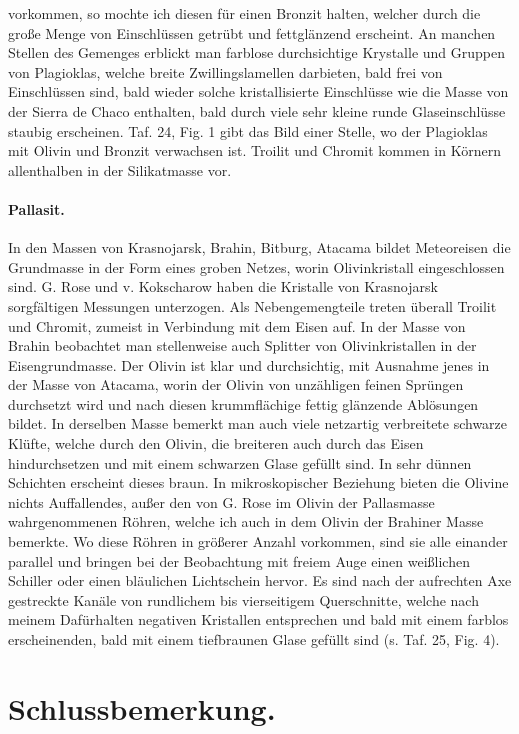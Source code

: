 \documentclass[a4paper, 12pt, oneside]{article}
\begin{document}
vorkommen, so mochte ich diesen für einen Bronzit halten, welcher durch die große Menge von Einschlüssen getrübt und fettglänzend erscheint. An manchen Stellen des Gemenges erblickt man farblose durchsichtige Krystalle und Gruppen von Plagioklas, welche breite Zwillingslamellen darbieten, bald frei von Einschlüssen sind, bald wieder solche kristallisierte Einschlüsse wie die Masse von der Sierra de Chaco enthalten, bald durch viele sehr kleine runde Glaseinschlüsse staubig erscheinen. Taf. 24, Fig. 1 gibt das Bild einer Stelle, wo der Plagioklas mit Olivin und Bronzit verwachsen ist. Troilit und Chromit kommen in Körnern allenthalben in der Silikatmasse vor.

\paragraph{Pallasit.} In den Massen von Krasnojarsk, Brahin, Bitburg, Atacama bildet Meteoreisen die Grundmasse in der Form eines groben Netzes, worin Olivinkristall eingeschlossen sind. G. Rose und v. Kokscharow haben die Kristalle von Krasnojarsk sorgfältigen Messungen unterzogen. Als Nebengemengteile treten überall Troilit und Chromit, zumeist in Verbindung mit dem Eisen auf. In der Masse von Brahin beobachtet man stellenweise auch Splitter von Olivinkristallen in der Eisengrundmasse. Der Olivin ist klar und durchsichtig, mit Ausnahme jenes in der Masse von Atacama, worin der Olivin von unzähligen feinen Sprüngen durchsetzt wird und nach diesen krummflächige fettig glänzende Ablösungen bildet. In derselben Masse bemerkt man auch viele netzartig verbreitete schwarze Klüfte, welche durch den Olivin, die breiteren auch durch das Eisen hindurchsetzen und mit einem schwarzen Glase gefüllt sind. In sehr dünnen Schichten erscheint dieses braun. In mikroskopischer Beziehung bieten die Olivine nichts Auffallendes, außer den von G. Rose im Olivin der Pallasmasse wahrgenommenen Röhren, welche ich auch in dem Olivin der Brahiner Masse bemerkte. Wo diese Röhren in größerer Anzahl vorkommen, sind sie alle einander parallel und bringen bei der Beobachtung mit freiem Auge einen weißlichen Schiller oder einen bläulichen Lichtschein hervor. Es sind nach der aufrechten Axe gestreckte Kanäle von rundlichem bis vierseitigem Querschnitte, welche nach meinem Dafürhalten negativen Kristallen entsprechen und bald mit einem farblos erscheinenden, bald mit einem tiefbraunen Glase gefüllt sind (s. Taf. 25, Fig. 4).
\clearpage
\section{Schlussbemerkung.}
\end{document}
